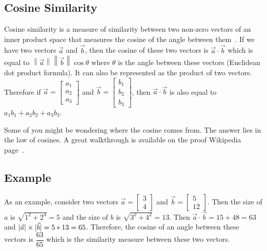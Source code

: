 \documentclass[11pt]{article}
\DeclarePairedDelimiter\abs{\lvert}{\rvert}               %
\begin{document}
\subsection{Cosine Similarity}

Cosine similarity is a measure of similarity between two non-zero vectors of an
inner product space that measures the cosine of the angle between
them~\cite{wikicosine}. If we have two vectors \(\vec{a}\) and \(\vec{b}\),
then the cosine of these two vectors is \(\vec{a} \cdot \vec{b}\) which is
equal to \(\left\|\vec{a}\right\|\left\|\vec{b}\right\|\cos\theta\) where
\(\theta\) is the angle between these vectors (Euclidean dot product formula).
It can also be represented as the product of two vectors. Therefore if
\(\vec{a} = \begin{bmatrix}a_1 \\ a_2 \\ a_3\end{bmatrix}\) and
\(\vec{b} = \begin{bmatrix}b_1 \\ b_2 \\ b_3\end{bmatrix}\), then
\(\vec{a} \cdot \vec{b}\) is also equal to \(a_1b_1 + a_2b_2 + a_3b_3\).

\bigskip

Some of you might be wondering where the cosine comes from. The answer lies in
the law of cosines. A great walkthrough is available on the proof Wikipedia
page~\cite{wikicosineproof}.

\subsection{Example}

As an example, consider two vectors
\(\vec{a} = \begin{bmatrix}3 \\ 4\end{bmatrix}\)
and \(\vec{b} = \begin{bmatrix}5 \\ 12\end{bmatrix}\). Then the size of \(a\) is
\(\sqrt{1^2 + 2^4} = 5\) and the size of \(b\) is \(\sqrt{3^2 + 4^2} = 13\).
Then \(\vec{a} \cdot \vec{b} = 15 + 48 = 63\) and
\(\abs{\vec{a}} \times \abs{\vec{b}} = 5 * 13 = 65\). Therefore, the cosine of
an angle between these vectors is \(\dfrac{63}{65}\) which is the similarity
measure between these two vectors.

\end{document}
